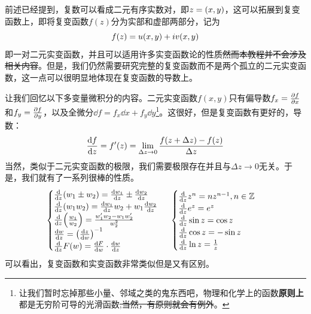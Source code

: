 \documentclass[12pt,a4paper,openany,twoside]{book}
\numberwithin{equation}{section}
\newcommand{\ud}{\mathrm{d}}
\begin{document}
            前述已经提到，复数可以看成二元有序实数对，即$z=\qty(x,y)$，这可以拓展到复变函数上，即将复变函数$f(z)$分为实部和虚部两部分，记为
            \begin{equation}
              f\qty(z)=u\qty(x,y)+iv\qty(x,y)
            \end{equation}
            即一对二元实变函数，并且可以适用许多实变函数论的性质\sout{然而本教程并不会涉及相关内容}。但是，我们仍然需要研究完整的复变函数而不是两个孤立的二元实变函数，这一点可以很明显地体现在复变函数的导数上。

            让我们回忆以下多变量微积分的内容。二元实变函数$f(x,y)$只有偏导数$f_x=\pdv{f}{x}$和$f_y=\pdv{f}{y}$，以及全微分$\dd{f}=f_x\dd{x}+f_y\dd{y}$\footnote{让我们暂时忘掉那些小量、邻域之类的鬼东西吧，物理和化学上的函数\textbf{原则上}都是无穷阶可导的光滑函数\sout{,当然，有原则就会有例外}。}。这很好，但是复变函数有更好的，导数：
            \begin{equation}
              \dv{f}{z}=f'\qty(z)=\lim_{\Delta z\rightarrow0}{\frac{f\qty(z+\Delta z)-f\qty(z)}{\Delta z}}
            \end{equation}
            当然，类似于二元实变函数的极限，我们需要极限存在并且与$\Delta z\rightarrow0$无关。于是，我们就有了一系列很棒的性质。
            \begin{equation*}
              \begin{cases}
                \dv{z}\qty(w_1\pm w_2)=\dv{w_1}{z}\pm\dv{w_2}{z}\\
                \dv{z}\qty(w_1w_2)=\frac{\ud w_1}{\ud z}w_2+w_1\frac{\ud w_2}{\ud z}\\
                \dv{z}\qty(\frac{w_1}{w_2})=\frac{w'_1w_2-w_1w'_2}{w_2^2}\\
                \dv{w}{z}=\qty(\dv{z}{w})^{-1}\\
                \dv{z}F\qty(w)=\dv{F}{w}\cdot\dv{w}{z}
              \end{cases}\ \begin{cases}
                \dv{z}z^n=nz^{n-1},n\in\mathbb{Z}\\
                \dv{z}e^z=e^z\\
                \dv{z}\sin z=\cos z\\
                \dv{z}\cos z=-\sin z\\
                \dv{z}\ln z=\frac{1}{z}
              \end{cases}
            \end{equation*}
            可以看出，复变函数和实变函数非常类似但是又有区别。
\end{document}
